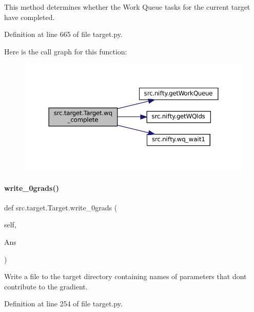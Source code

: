 This method determines whether the Work Queue tasks for the current target have completed. 



Definition at line 665 of file target.\+py.

Here is the call graph for this function\+:
\nopagebreak
\begin{figure}[H]
\begin{center}
\leavevmode
\includegraphics[width=350pt]{classsrc_1_1target_1_1Target_aeb7582896efcfe1d0316a4ee80fc5634_cgraph}
\end{center}
\end{figure}
\mbox{\label{classsrc_1_1target_1_1Target_af4d54bc36363a73ab3cec203a30d72be}} 
\paragraph{\texorpdfstring{write\+\_\+0grads()}{write\_0grads()}}
{\footnotesize\ttfamily def src.\+target.\+Target.\+write\+\_\+0grads (\begin{DoxyParamCaption}\item[{}]{self,  }\item[{}]{Ans }\end{DoxyParamCaption})\hspace{0.3cm}{\ttfamily [inherited]}}



Write a file to the target directory containing names of parameters that don\textquotesingle{}t contribute to the gradient. 



Definition at line 254 of file target.\+py.



